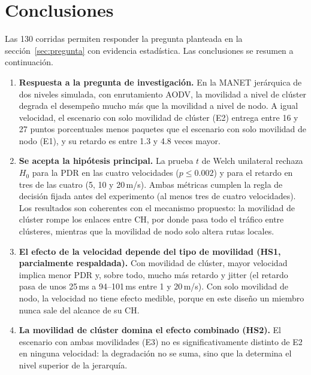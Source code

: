 \section{Conclusiones}
\label{sec:conclusiones}

Las 130 corridas permiten responder la pregunta planteada en la
sección~\ref{sec:pregunta} con evidencia estadística. Las conclusiones se resumen a
continuación.

\begin{enumerate}[label=\arabic*.]
    \item \textbf{Respuesta a la pregunta de investigación.} En la MANET jerárquica de
    dos niveles simulada, con enrutamiento AODV, la movilidad a nivel de clúster degrada
    el desempeño mucho más que la movilidad a nivel de nodo. A igual velocidad, el
    escenario con solo movilidad de clúster (E2) entrega entre 16 y 27 puntos
    porcentuales menos paquetes que el escenario con solo movilidad de nodo (E1), y su
    retardo es entre 1.3 y 4.8 veces mayor.

    \item \textbf{Se acepta la hipótesis principal.} La prueba $t$ de Welch unilateral
    rechaza $H_0$ para la PDR en las cuatro velocidades ($p \leq 0.002$) y para el
    retardo en tres de las cuatro (5, 10 y 20\,m/s). Ambas métricas cumplen la regla de
    decisión fijada antes del experimento (al menos tres de cuatro velocidades). Los
    resultados son coherentes con el mecanismo propuesto: la movilidad de clúster rompe
    los enlaces entre CH, por donde pasa todo el tráfico entre clústeres, mientras que
    la movilidad de nodo solo altera rutas locales.

    \item \textbf{El efecto de la velocidad depende del tipo de movilidad (HS1,
    parcialmente respaldada).} Con movilidad de clúster, mayor velocidad implica menor
    PDR y, sobre todo, mucho más retardo y jitter (el retardo pasa de unos 25\,ms a
    94--101\,ms entre 1 y 20\,m/s). Con solo movilidad de nodo, la velocidad no tiene
    efecto medible, porque en este diseño un miembro nunca sale del alcance de su CH.

    \item \textbf{La movilidad de clúster domina el efecto combinado (HS2).} El escenario
    con ambas movilidades (E3) no es significativamente distinto de E2 en ninguna
    velocidad: la degradación no se suma, sino que la determina el nivel superior de la
    jerarquía.


\end{enumerate}
